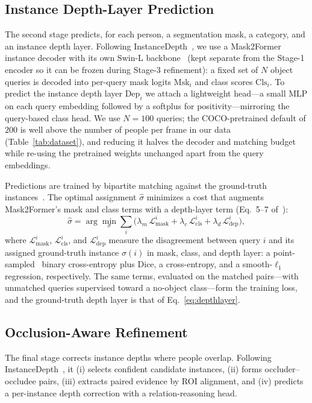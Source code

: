 \documentclass[sigconf, review=true]{acmart}
\begin{document}
\subsection{Instance Depth-Layer Prediction}
\label{ssec:phase2}
The second stage predicts, for each person, a segmentation mask, a category,
and an instance depth layer. Following InstanceDepth~\cite{liang2025instancedepth},
we use a Mask2Former~\cite{cheng2022mask2former} instance decoder with its own
Swin-L backbone~\cite{liu2021swin} (kept separate from the Stage-1 encoder so it
can be frozen during Stage-3 refinement): a fixed set of $N$ object queries is
decoded into per-query mask logits $\mathrm{Msk}_i$ and class scores
$\mathrm{Cls}_i$. To predict the instance depth layer $\mathrm{Dep}_i$ we attach
a lightweight head---a small MLP on each query embedding followed by a softplus
for positivity---mirroring the query-based class head. We use $N{=}100$ queries;
the COCO-pretrained default of $200$ is well above the number of people per
frame in our data (Table~\ref{tab:dataset}), and reducing it halves the decoder
and matching budget while re-using the pretrained weights unchanged apart from
the query embeddings.

Predictions are trained by bipartite matching against the ground-truth
instances~\cite{liang2025instancedepth,carion2020detr}. The optimal assignment
$\hat\sigma$ minimizes a cost that augments Mask2Former's mask and class terms
with a depth-layer term (Eq.~5--7 of~\cite{liang2025instancedepth}):
\begin{equation}
\label{eq:match}
\hat\sigma=\arg\min_{\sigma}\sum_i
\big(\lambda_m\,\mathcal{L}^{i}_{\mathrm{mask}}
    +\lambda_c\,\mathcal{L}^{i}_{\mathrm{cls}}
    +\lambda_d\,\mathcal{L}^{i}_{\mathrm{dep}}\big),
\end{equation}
where $\mathcal{L}^{i}_{\mathrm{mask}}$, $\mathcal{L}^{i}_{\mathrm{cls}}$, and
$\mathcal{L}^{i}_{\mathrm{dep}}$ measure the disagreement between query $i$ and
its assigned ground-truth instance $\sigma(i)$ in mask, class, and depth layer:
a point-sampled~\cite{kirillov2020pointrend} binary cross-entropy plus Dice, a
cross-entropy, and a smooth-$\ell_1$ regression, respectively. The same terms,
evaluated on the matched pairs---with unmatched queries supervised toward a
no-object class---form the training loss, and the ground-truth depth layer is
that of Eq.~\eqref{eq:depthlayer}.

\subsection{Occlusion-Aware Refinement}
\label{ssec:phase3}
The final stage corrects instance depths where people overlap. Following
InstanceDepth~\cite{liang2025instancedepth}, it (i) selects confident candidate
instances, (ii) forms occluder--occludee pairs, (iii) extracts paired evidence
by ROI alignment, and (iv) predicts a per-instance depth correction with a
relation-reasoning head.
\end{document}
